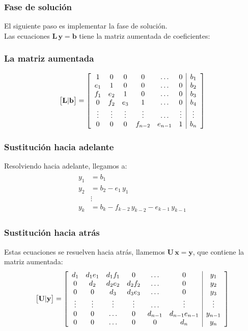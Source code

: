 \documentclass[12pt]{beamer}
\begin{document}
\begin{frame}
\frametitle{Fase de solución}
El siguiente paso es implementar la fase de solución.
\\
\bigskip
\pause
Las ecuaciones $\mathbf{L \, y} =  \mathbf{b}$ tiene la matriz aumentada de coeficientes:
\end{frame}
\begin{frame}
\frametitle{La matriz aumentada}
\renewcommand{\arraystretch}{0.9}
\begin{align*}
\big[ \mathbf{L} \vert \mathbf{b} \big] = 
\left[
\begin{array}{c c c c c c | c}
1 & 0 & 0 & 0 & \ldots & 0 & b_{1} \\
e_{1} & 1 & 0 & 0 & \ldots & 0 & b_{2} \\
f_{1} & e_{2} & 1 & 0 & \ldots & 0 & b_{3} \\
0 & f_{2} & e_{3} & 1 & \ldots & 0 & b_{4} \\
\vdots & \vdots & \vdots & \vdots & \ldots & \vdots & \vdots \\
0 & 0 & 0 & f_{n-2} & e_{n-1} & 1 & b_{n}
\end{array}
\right]
\end{align*}
\end{frame}
\begin{frame}
\frametitle{Sustitución hacia adelante}
Resolviendo hacia adelante, llegamos a:
\pause
\begin{align}
\begin{aligned}
y_{1} &= b_{1} \\[0.5em]
y_{2} &= b_{2} - e_{1} \, y_{1} \\[0.5em]
&\vdots \\
y_{k} &= b_{k} - f_{k-2} \, y_{k-2} - e_{k-1} \, y_{k-1}
\end{aligned}
\label{eq:ecuacion_02_28}
\end{align}
\end{frame}
\begin{frame}
\frametitle{Sustitución hacia atrás}
Estas ecuaciones se resuelven hacia atrás, \pause llamemos $\mathbf{U \, x} = \mathbf{y}$, que contiene la matriz aumentada:
\pause
\renewcommand{\arraystretch}{0.9}
\begin{align*}
\big[ \mathbf{U} \vert \mathbf{y} \big] = 
\left[
\begin{array}{c c c c c c | c}
d_{1} & d_{1} e_{1} & d_{1} f_{1} & 0 & \ldots & 0 & y_{1} \\
0 & d_{2} & d_{2} e_{2} & d_{2} f_{2} & \ldots & 0 & y_{2} \\
0 & 0 & d_{3} & d_{3} e_{3} & \ldots & 0 & y_{3} \\
\vdots & \vdots & \vdots & \vdots & \ldots & \vdots & \vdots \\
0 & 0 & \ldots & 0 & d_{n-1} & d_{n-1} e_{n-1} & y_{n-1} \\
0 & 0 & \ldots & 0 & 0 & d_{n} & y_{n}
\end{array}
\right]
\end{align*}
\end{frame}
\end{document}
